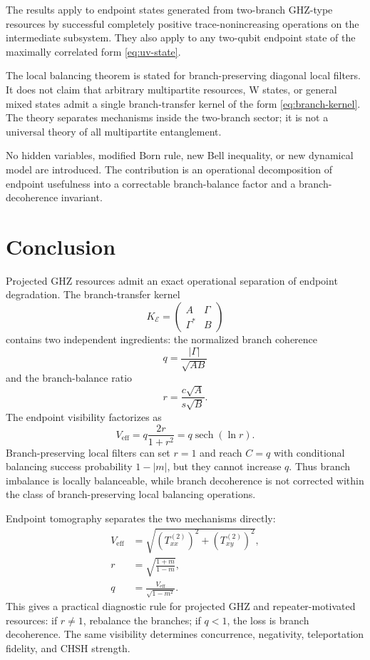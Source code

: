 \documentclass[reprint,aps,pra,superscriptaddress,nofootinbib,longbibliography]{revtex4-2}
\newcommand{\sech}{\operatorname{sech}}
\newcommand{\Veff}{V_{\mathrm{eff}}}
\newcommand{\Kbr}{K_{\mathcal E}}
\begin{document}
The results apply to endpoint states generated from two-branch GHZ-type resources by successful completely positive trace-nonincreasing operations on the intermediate subsystem.  They also apply to any two-qubit endpoint state of the maximally correlated form \eqref{eq:uv-state}.

The local balancing theorem is stated for branch-preserving diagonal local filters.  It does not claim that arbitrary multipartite resources, W states, or general mixed states admit a single branch-transfer kernel of the form \eqref{eq:branch-kernel}.  The theory separates mechanisms inside the two-branch sector; it is not a universal theory of all multipartite entanglement.

No hidden variables, modified Born rule, new Bell inequality, or new dynamical model are introduced.  The contribution is an operational decomposition of endpoint usefulness into a correctable branch-balance factor and a branch-decoherence invariant.

\section{Conclusion}

Projected GHZ resources admit an exact operational separation of endpoint degradation.  The branch-transfer kernel
\begin{equation}
\Kbr=
\begin{pmatrix}
A&\Gamma\\
\Gamma^*&B
\end{pmatrix}
\end{equation}
contains two independent ingredients: the normalized branch coherence
\begin{equation}
q=\frac{|\Gamma|}{\sqrt{AB}}
\end{equation}
and the branch-balance ratio
\begin{equation}
r=\frac{c\sqrt A}{s\sqrt B}.
\end{equation}
The endpoint visibility factorizes as
\begin{equation}
\Veff=q\frac{2r}{1+r^2}=q\sech(\ln r).
\end{equation}
Branch-preserving local filters can set \(r=1\) and reach \(C=q\) with conditional balancing success probability \(1-|m|\), but they cannot increase \(q\).  Thus branch imbalance is locally balanceable, while branch decoherence is not corrected within the class of branch-preserving local balancing operations.

Endpoint tomography separates the two mechanisms directly:
\begin{align}
\Veff&=\sqrt{(T^{(2)}_{xx})^2+(T^{(2)}_{xy})^2},\nonumber\\
r&=\sqrt{\frac{1+m}{1-m}},\nonumber\\
q&=\frac{\Veff}{\sqrt{1-m^2}}.
\end{align}
This gives a practical diagnostic rule for projected GHZ and repeater-motivated resources: if \(r\ne1\), rebalance the branches; if \(q<1\), the loss is branch decoherence.  The same visibility determines concurrence, negativity, teleportation fidelity, and CHSH strength.
\end{document}
